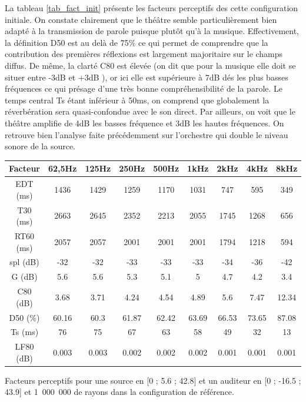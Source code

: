 La tableau \ref{tab_fact_init} présente les facteurs perceptifs des cette configuration initiale. On constate clairement que le théâtre semble particulièrement bien adapté à la transmission de parole puisque plutôt qu'à la musique. Effectivement, la définition \gls{D50} est au delà de 75\% ce qui permet de comprendre que la contribution des premières réflexions est largement majoritaire sur le champs diffus. De même, la clarté \gls{C80} est élevée (on dit que pour la musique elle doit se situer entre -3dB et +3dB \cite[p.59]{acoustique}), or ici elle est supérieure à 7dB dés les plus basses fréquences ce qui présage d'une très bonne compréhensibilité de la parole. Le temps central \gls{Ts} étant inférieur à 50ms, on comprend que globalement la réverbération sera quasi-confondue avec le son direct. Par ailleurs, on voit que le théâtre amplifie de 4dB les basses fréquence et 3dB les hautes fréquences. On retrouve bien l'analyse faite précédemment sur l'orchestre qui double le niveau sonore de la source.
%
\begin{tableth} 
 \begin{tabular}{| *{9}{c|}} 
 \hline 
 Facteur & 62,5Hz & 125Hz & 250Hz & 500Hz & 1kHz & 2kHz & 4kHz & 8kHz \\ 
 \hline 
 \hline 
\gls{EDT} (ms)& 1436& 1429& 1259& 1170& 1031& 747& 595& 349 \\ 
 \hline 
\gls{T30} (ms)& 2663& 2645& 2352& 2213& 2055& 1745& 1268& 656 \\ 
 \hline 
\gls{RT60} (ms)& 2057& 2057& 2001& 2001& 2001& 1794& 1218& 594 \\ 
 \hline 
\gls{spl} (dB)& -32& -32& -33& -33& -33& -34& -36& -42 \\ 
 \hline 
\gls{G} (dB)& 5.6& 5.6& 5.3& 5.1& 5& 4.7& 4.2& 3.4 \\ 
 \hline 
\gls{C80} (dB)& 3.68& 3.71& 4.24& 4.54& 4.89& 5.6& 7.47& 12.34 \\ 
 \hline 
\gls{D50} (\%)& 60.16& 60.3& 61.87& 62.42& 63.69& 66.53& 73.65& 87.08 \\ 
 \hline 
\gls{Ts} (ms)& 76& 75& 67& 63& 58& 49& 32& 13 \\ 
 \hline 
\gls{LF80} (dB)& 0.003& 0.003& 0.002& 0.002& 0.002& 0.001& 0.001& 0.001 \\ 
 \hline 
\end{tabular}  
 \caption{Facteurs perceptifs pour une source en [0 ; 5.6 ; 42.8] et un auditeur en [0 ; -16.5 ; 43.9] et 1~000~000 de rayons dans la configuration de référence.} 
 \label{tab_fact_init} 
 \end{tableth}



